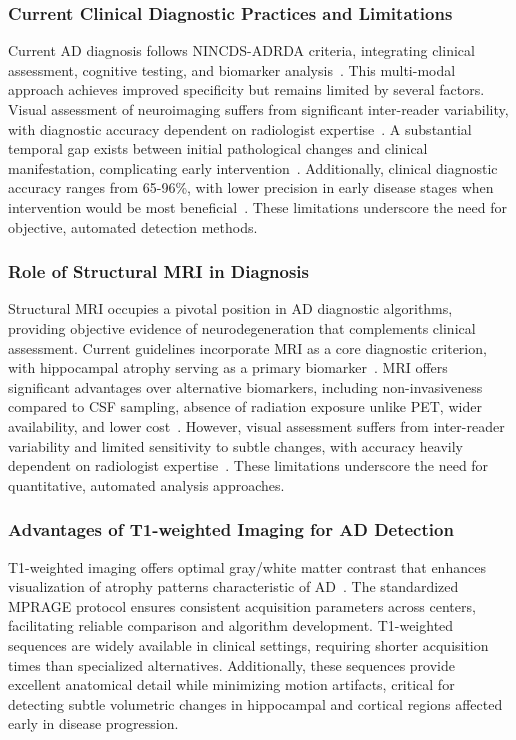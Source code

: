 \documentclass[12pt, a4paper]{article}
\begin{document}
\subsubsection{Current Clinical Diagnostic Practices and Limitations}

Current AD diagnosis follows NINCDS-ADRDA criteria, integrating clinical assessment, cognitive testing, and biomarker analysis~\cite{dubois2007research}. This multi-modal approach achieves improved specificity but remains limited by several factors. Visual assessment of neuroimaging suffers from significant inter-reader variability, with diagnostic accuracy dependent on radiologist expertise~\cite{cuingnet2011automatic}. A substantial temporal gap exists between initial pathological changes and clinical manifestation, complicating early intervention~\cite{jack2018nia}. Additionally, clinical diagnostic accuracy ranges from 65-96\%, with lower precision in early disease stages when intervention would be most beneficial~\cite{kloppel2008accuracy}. These limitations underscore the need for objective, automated detection methods.

\subsubsection{Role of Structural MRI in Diagnosis}

Structural MRI occupies a pivotal position in AD diagnostic algorithms, providing objective evidence of neurodegeneration that complements clinical assessment. Current guidelines incorporate MRI as a core diagnostic criterion, with hippocampal atrophy serving as a primary biomarker~\cite{dubois2007research}. MRI offers significant advantages over alternative biomarkers, including non-invasiveness compared to CSF sampling, absence of radiation exposure unlike PET, wider availability, and lower cost~\cite{vemuri2010role}. However, visual assessment suffers from inter-reader variability and limited sensitivity to subtle changes, with accuracy heavily dependent on radiologist expertise~\cite{kloppel2008accuracy}. These limitations underscore the need for quantitative, automated analysis approaches.

\subsubsection{Advantages of T1-weighted Imaging for AD Detection}

T1-weighted imaging offers optimal gray/white matter contrast that enhances visualization of atrophy patterns characteristic of AD~\cite{herrera2013classification}. The standardized MPRAGE protocol ensures consistent acquisition parameters across centers, facilitating reliable comparison and algorithm development. T1-weighted sequences are widely available in clinical settings, requiring shorter acquisition times than specialized alternatives. Additionally, these sequences provide excellent anatomical detail while minimizing motion artifacts, critical for detecting subtle volumetric changes in hippocampal and cortical regions affected early in disease progression.
\end{document}
